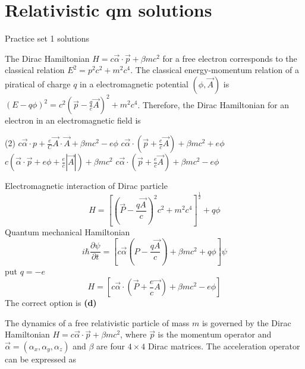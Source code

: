 \chapter{Relativistic qm solutions}
\begin{abox}
	Practice set 1 solutions
	\end{abox}
\begin{enumerate}
	\begin{minipage}{\textwidth}
		\item The Dirac Hamiltonian $H=c \vec{\alpha} \cdot \vec{p}+\beta m c^{2}$ for a free electron corresponds to the classical relation $E^{2}=p^{2} c^{2}+m^{2} c^{4}$. The classical energy-momentum relation of a piratical of charge $q$ in a electromagnetic potential $(\phi, \vec{A})$ is $(E-q \phi)^{2}=c^{2}\left(\vec{p}-\frac{q}{c} \vec{A}\right)^{2}+m^{2} c^{4}$.
		Therefore, the Dirac Hamiltonian for an electron in an electromagnetic field is
	\end{minipage}
	\begin{tasks}(2)
		\task[\textbf{A.}] $c \vec{\alpha} \cdot p+\frac{e}{C} \vec{A} \cdot \vec{A}+\beta m c^{2}-e \phi$
		\task[\textbf{B.}]$c \vec{\alpha} \cdot\left(\vec{p}+\frac{e}{c} \vec{A}\right)+\beta m c^{2}+e \phi$
		\task[\textbf{C.}]$c\left(\vec{\alpha} \cdot \vec{p}+e \phi+\frac{e}{c}|\vec{A}|\right)+\beta m c^{2}$
		\task[\textbf{D.}]$c \vec{\alpha} \cdot\left(\vec{p}+\frac{e}{c} \vec{A}\right)+\beta m c^{2}-e \phi$
	\end{tasks}
\begin{answer}
	Electromagnetic interaction of Dirac particle
	$$
	H=\left[\left(\vec{P}-\frac{q \vec{A}}{c}\right)^{2} c^{2}+m^{2} c^{4}\right]^{\frac{1}{2}}+q \phi
	$$
	Quantum mechanical Hamiltonian
	$$
	i \hbar \frac{\partial \psi}{\partial t}=\left[c \vec{\alpha}\left(P-\frac{q \vec{A}}{c}\right)+\beta m c^{2}+q \phi\right] \psi
	$$
	put $q=-e$
	$$
	H=\left[c \vec{\alpha} \cdot\left(\vec{P}+\frac{e}{c} \vec{A}\right)+\beta m c^{2}-e \phi\right]
	$$
	The correct option is \textbf{(d)}
\end{answer}
\begin{minipage}{\textwidth}
	\item The dynamics of a free relativistic particle of mass $m$ is governed by the Dirac Hamiltonian $H=c \vec{\alpha} \cdot \vec{p}+\beta m c^{2}$, where $\vec{p}$ is the momentum operator and $\vec{\alpha}=\left(\alpha_{x}, \alpha_{y}, \alpha_{z}\right)$ and $\beta$ are four $4 \times 4$ Dirac matrices. The acceleration operator can be expressed as

\end{minipage}
\end{enumerate}
